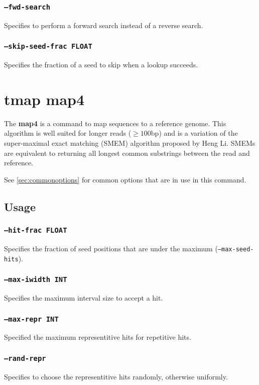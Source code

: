 \documentclass[a4paper,12pt]{book}
\newcommand{\TT}[1]{{\tt #1}} %
\newcommand{\BF}[1]{{\bf #1}} %
\begin{document}
\subsubsection{\TT{--fwd-search}}
Specifies to perform a forward search instead of a reverse search.

\subsubsection{\TT{--skip-seed-frac FLOAT}}
Specifies the fraction of a seed to skip when a lookup succeeds.

\section{tmap map4}
\label{sec:map4}
The \BF{map4} is a command to map sequences to a reference genome.
This algorithm is well suited for longer reads ($\geq 100$bp) and is a variation of the super-maximal exact matching (SMEM) algorithm proposed by Heng Li.
SMEMs are equivalent to returning all longest common substrings between the read and reference.

See \autoref{sec:commonoptions} for common options that are in use in this command.

\subsection{Usage}

\subsubsection{\TT{--hit-frac FLOAT}}
Specifies the fraction of seed positions that are under the maximum (\TT{--max-seed-hits}).

\subsubsection{\TT{--max-iwidth INT}}
Specifies the maximum interval size to accept a hit.

\subsubsection{\TT{--max-repr INT}}
Specified the maximum representitive hits for repetitive hits.

\subsubsection{\TT{--rand-repr}}
Specifies to choose the representitive hits randomly, otherwise uniformly.
\end{document}
